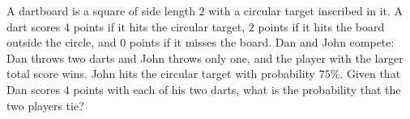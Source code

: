 A dartboard is a square of side length $2$ with a circular target inscribed in it. A dart scores $4$ points if it hits the circular target, $2$ points if it hits the board outside the circle, and $0$ points if it misses the board. Dan and John compete: Dan throws two darts and John throws only one, and the player with the larger total score wins. John hits the circular target with probability $75\%$. Given that Dan scores $4$ points with each of his two darts, what is the probability that the two players tie?
